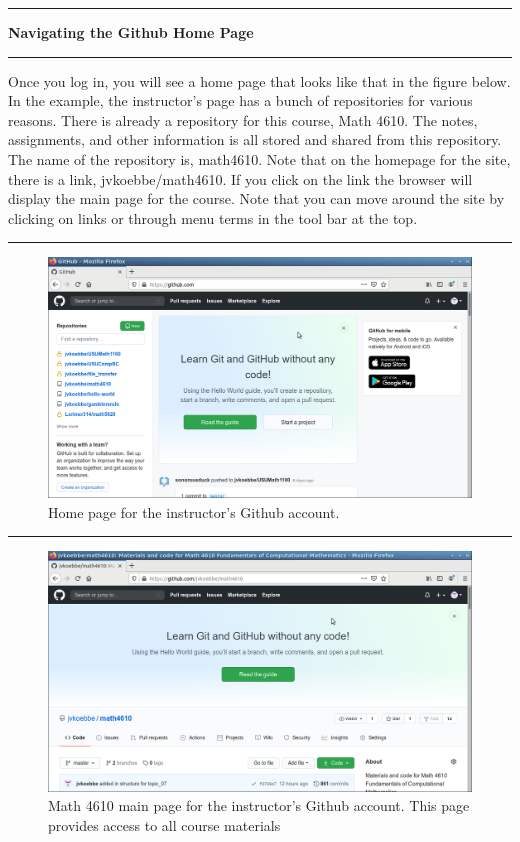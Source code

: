 \documentclass[10pt,fleqn]{article}
\begin{document}
\vskip0.1in\hrule\vskip0.1in\noindent
{\bf Navigating the Github Home Page} 
\vskip0.1in\hrule\vskip0.1in\noindent
Once you log in, you will see a home page that looks like that in the figure
below. In the example, the instructor's page has a bunch of repositories for
various reasons. There is already a repository for this course, Math 4610. The
notes, assignments, and other information is all stored and shared from this
repository. The name of the repository is, math4610. Note that on the homepage
for the site, there is a link, jvkoebbe/math4610. If you click on the link the
browser will display the main page for the course. Note that you can move around
the site by clicking on links or through menu terms in the tool bar at the top.
\vskip0.1in\hrule\vskip0.1in
\vfill
\begin{figure}[h]
\centering
\includegraphics[width=5.0in]{../images/github_04.png}
\caption{Home page for the instructor's Github account.}
\end{figure}
\vskip0.1in\hrule\vskip0.1in
\vfill
\begin{figure}[h]
\centering
\includegraphics[width=5.0in]{../images/github_05.png}
\caption{Math 4610 main page for the instructor's Github account. This page
        provides access to all course materials}
\end{figure}
\end{document}
